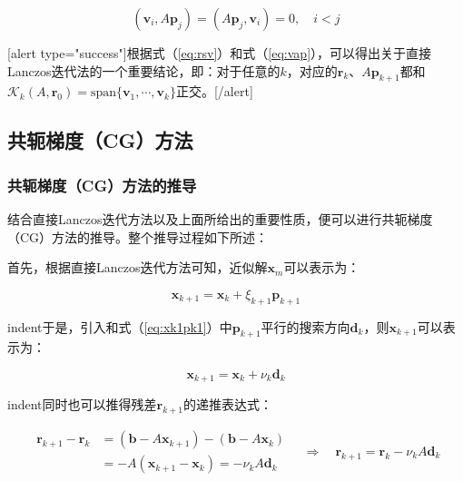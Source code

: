 \documentclass[UTF8,nofonts]{ctexart}
\begin{document}
\begin{equation}
\label{eq:vap}
\left(\boldsymbol{v}_i,A\boldsymbol{p}_j\right)=\left(A\boldsymbol{p}_j,\boldsymbol{v}_i\right)=0,\quad i<j
\end{equation}

[alert type="success"]根据式（\ref{eq:rsv}）和式（\ref{eq:vap}），可以得出关于直接Lanczos迭代法的一个重要结论，即：对于任意的$k$，对应的$\boldsymbol{r}_k$、$A\boldsymbol{p}_{k+1}$都和$\mathcal{K}_k(A,\boldsymbol{r}_0)=\text{span}\{\boldsymbol{v}_1,\cdots,\boldsymbol{v}_k\}$正交。[/alert]

\subsection*{共轭梯度（CG）方法}

\subsubsection*{共轭梯度（CG）方法的推导}

结合直接Lanczos迭代方法以及上面所给出的重要性质，便可以进行共轭梯度（CG）方法的推导。整个推导过程如下所述：

首先，根据直接Lanczos迭代方法可知，近似解$\boldsymbol{x}_m$可以表示为：

\begin{equation}
\label{eq:xk1pk1}
\boldsymbol{x}_{k+1}=\boldsymbol{x}_k+\xi_{k+1}\boldsymbol{p}_{k+1}
\end{equation}

indent于是，引入和式（\ref{eq:xk1pk1}）中$\boldsymbol{p}_{k+1}$平行的搜索方向$\boldsymbol{d}_k$，则$\boldsymbol{x}_{k+1}$可以表示为：

\begin{equation}
\label{eq:xk1dk}
\boldsymbol{x}_{k+1}=\boldsymbol{x}_k+\nu_k\boldsymbol{d}_k
\end{equation}

indent同时也可以推得残差$\boldsymbol{r}_{k+1}$的递推表达式：

\begin{equation}
\label{eq:rk1adk}
\begin{aligned}
\boldsymbol{r}_{k+1}-\boldsymbol{r}_k&=(\boldsymbol{b}-A\boldsymbol{x}_{k+1})-(\boldsymbol{b}-A\boldsymbol{x}_{k}) \\
&=-A(\boldsymbol{x}_{k+1}-\boldsymbol{x}_k)=-\nu_kA\boldsymbol{d}_k
\end{aligned}\quad\Longrightarrow\quad
\boldsymbol{r}_{k+1}=\boldsymbol{r}_k-\nu_kA\boldsymbol{d}_k
\end{equation}
\end{document}
